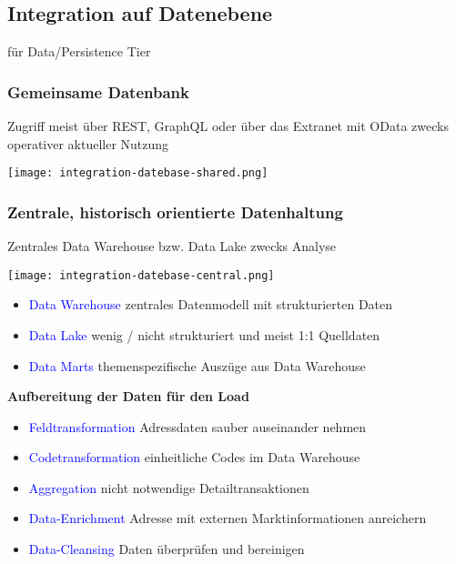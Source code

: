 \subsection{Integration auf Datenebene}

für Data/Persistence Tier

\subsubsection{Gemeinsame Datenbank}

Zugriff meist über REST, GraphQL oder über das Extranet mit OData zwecks operativer aktueller Nutzung

\texttt{[image: integration-datebase-shared.png]}

\subsubsection{Zentrale, historisch orientierte Datenhaltung}

Zentrales Data Warehouse bzw. Data Lake zwecks Analyse

\texttt{[image: integration-datebase-central.png]}

\begin{itemize}
    \item \textcolor{blue}{Data Warehouse} zentrales Datenmodell mit strukturierten Daten
    \item \textcolor{blue}{Data Lake} wenig / nicht strukturiert und meist 1:1 Quelldaten
    \item \textcolor{blue}{Data Marts} themenspezifische Auszüge aus Data Warehouse
\end{itemize}
\vspace{10pt}
\textbf{Aufbereitung der Daten für den Load}

\begin{itemize}
    \item \textcolor{blue}{Feldtransformation} Adressdaten sauber auseinander nehmen
    \item \textcolor{blue}{Codetransformation} einheitliche Codes im Data Warehouse
    \item \textcolor{blue}{Aggregation} nicht notwendige Detailtransaktionen
    \item \textcolor{blue}{Data-Enrichment} Adresse mit externen Marktinformationen anreichern
    \item \textcolor{blue}{Data-Cleansing} Daten überprüfen und bereinigen
\end{itemize}

